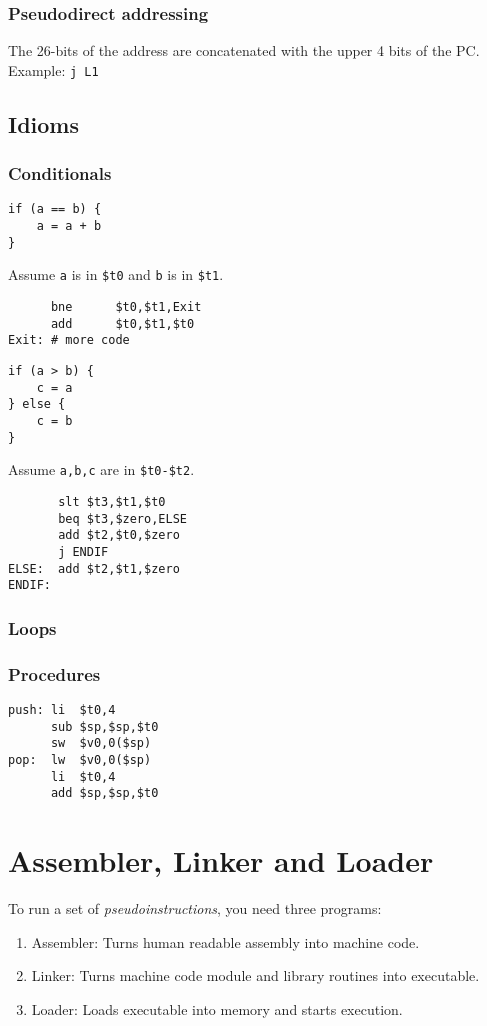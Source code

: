 \documentclass{article}
\newcommand{\T}[1]{\texttt{#1}}
\begin{document}
\subsubsection{Pseudodirect addressing}
The 26-bits of the address are concatenated with the upper 4 bits of the PC.\\
Example: \T{j L1}
\subsection{Idioms}
\subsubsection{Conditionals}
\begin{verbatim}
if (a == b) {
	a = a + b
}
\end{verbatim}
Assume \T{a} is in \T{\$t0} and \T{b} is in \T{\$t1}.
\begin{verbatim}
      bne      $t0,$t1,Exit
      add      $t0,$t1,$t0
Exit: # more code
\end{verbatim}
\B{\T{max(a,b)} function:}
\begin{verbatim}
if (a > b) {
	c = a
} else {
	c = b
}
\end{verbatim}
Assume \T{a,b,c} are in \T{\$t0-\$t2}.
\begin{verbatim}
       slt $t3,$t1,$t0
       beq $t3,$zero,ELSE
       add $t2,$t0,$zero
       j ENDIF
ELSE:  add $t2,$t1,$zero
ENDIF: 
\end{verbatim}
\subsubsection{Loops}
\subsubsection{Procedures}
\begin{verbatim}
push: li  $t0,4
      sub $sp,$sp,$t0
      sw  $v0,0($sp)
pop:  lw  $v0,0($sp)
      li  $t0,4
      add $sp,$sp,$t0
\end{verbatim}
\section{Assembler, Linker and Loader}
To run a set of \emph{pseudoinstructions}, you need three programs:
\begin{enumerate}
	\item Assembler: Turns human readable assembly into machine code.
	\item Linker: Turns machine code module and library routines into executable.
	\item Loader: Loads executable into memory and starts execution.
\end{enumerate}
\end{document}
